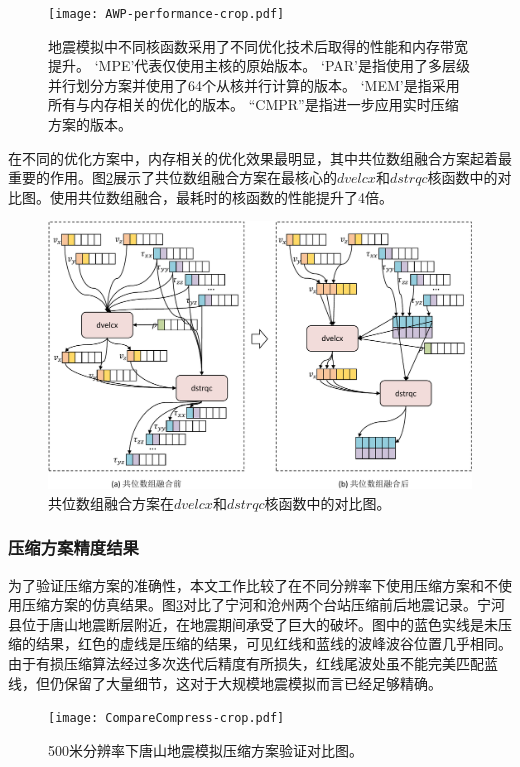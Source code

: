 \begin{figure}[t]
\centering
\texttt{[image: AWP-performance-crop.pdf]}
\caption{地震模拟中不同核函数采用了不同优化技术后取得的性能和内存带宽提升。 `MPE'代表仅使用主核的原始版本。 `PAR'是指使用了多层级并行划分方案并使用了64个从核并行计算的版本。 `MEM'是指采用所有与内存相关的优化的版本。 “CMPR”是指进一步应用实时压缩方案的版本。}
\label{fig:kernel-result}
\end{figure}

在不同的优化方案中，内存相关的优化效果最明显，其中共位数组融合方案起着最重要的作用。图\ref{fig:fusioncmp}展示了共位数组融合方案在最核心的$dvelcx$和$dstrqc$核函数中的对比图。使用共位数组融合，最耗时的核函数的性能提升了4倍。

\begin{figure}[ht]
\centering
\includegraphics[width=0.9\columnwidth]{figures/数组融合前后对比-crop.pdf}
\caption{共位数组融合方案在$dvelcx$和$dstrqc$核函数中的对比图。}
\label{fig:fusioncmp}
\end{figure}

\subsubsection{压缩方案精度结果}


为了验证压缩方案的准确性，本文工作比较了在不同分辨率下使用压缩方案和不使用压缩方案的仿真结果。图\ref {fig:compress_valid}对比了宁河和沧州两个台站压缩前后地震记录。宁河县位于唐山地震断层附近，在地震期间承受了巨大的破坏。图中的蓝色实线是未压缩的结果，红色的虚线是压缩的结果，可见红线和蓝线的波峰波谷位置几乎相同。由于有损压缩算法经过多次迭代后精度有所损失，红线尾波处虽不能完美匹配蓝线，但仍保留了大量细节，这对于大规模地震模拟而言已经足够精确。


\begin{figure}[ht]
\centering
\texttt{[image: CompareCompress-crop.pdf]}
\caption{500米分辨率下唐山地震模拟压缩方案验证对比图。}
\label{fig:compress_valid}
\end{figure}


